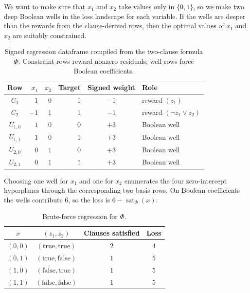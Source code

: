 \documentclass[11pt]{article}
\begin{document}
We want to make sure that \(x_1\) and \(x_2\) take values only in \(\{0,1\}\), so we make two deep Boolean wells in the loss landscape for each variable. If the wells are deeper than the rewards from the clause-derived rows, then the optimal values of \(x_1\) and \(x_2\) are suitably constrained.

\begin{table}[H]
\centering
\small
\begin{tabular}{@{}crrrcl@{}}
\toprule
Row & $x_1$ & $x_2$ & Target & Signed weight & Role \\
\midrule
$C_1$ & $1$ & $0$ & $1$ & $-1$ & reward $(z_1)$ \\
$C_2$ & $-1$ & $1$ & $1$ & $-1$ & reward $(\neg z_1\vee z_2)$ \\
$U_{1,0}$ & $1$ & $0$ & $0$ & $+3$ & Boolean well \\
$U_{1,1}$ & $1$ & $0$ & $1$ & $+3$ & Boolean well \\
$U_{2,0}$ & $0$ & $1$ & $0$ & $+3$ & Boolean well \\
$U_{2,1}$ & $0$ & $1$ & $1$ & $+3$ & Boolean well \\
\bottomrule
\end{tabular}
\caption{Signed regression dataframe compiled from the two-clause formula \(\Phi\). Constraint rows reward nonzero residuals; well rows force Boolean coefficients.}
\label{tab:cnf-dataframe}
\end{table}

Choosing one well for \(x_1\) and one for \(x_2\) enumerates the four zero-intercept hyperplanes through the corresponding two basis rows. On Boolean coefficients the wells contribute \(6\), so the loss is \(6-\operatorname{sat}_{\Phi}(x)\):

\begin{table}[H]
\centering
\small
\begin{tabular}{@{}cccc@{}}
\toprule
$x$ & $(z_1,z_2)$ & Clauses satisfied & Loss \\
\midrule
$(0,0)$ & $(\mathrm{true},\mathrm{true})$ & $2$ & $4$ \\
$(0,1)$ & $(\mathrm{true},\mathrm{false})$ & $1$ & $5$ \\
$(1,0)$ & $(\mathrm{false},\mathrm{true})$ & $1$ & $5$ \\
$(1,1)$ & $(\mathrm{false},\mathrm{false})$ & $1$ & $5$ \\
\bottomrule
\end{tabular}
\caption{Brute-force regression for \(\Phi\).}
\label{tab:cnf-candidates}
\end{table}
\end{document}
